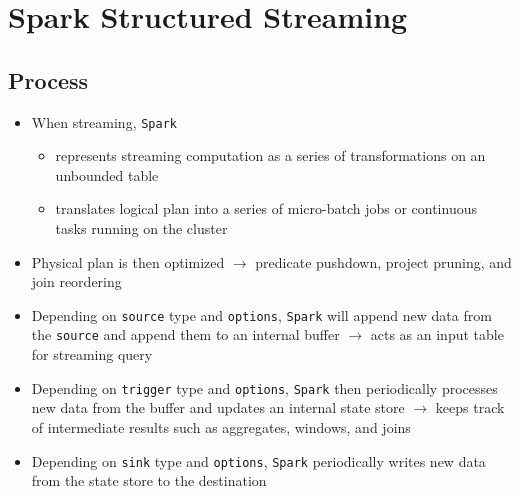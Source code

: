 \documentclass[11pt]{scrartcl}
\begin{document}
\section{Spark Structured Streaming} \label{structured_streaming}
\subsection{Process}
\begin{itemize}
	\item When streaming, \texttt{Spark} 
	\begin{itemize}
		\item represents streaming computation as a series of transformations on an unbounded table
		\item translates logical plan into a series of micro-batch jobs or continuous tasks running on the cluster
	\end{itemize}
	\item Physical plan is then optimized $\to$ predicate pushdown, project pruning, and join reordering
	\item Depending on \texttt{source} type and \texttt{options}, \texttt{Spark} will append new data from the \texttt{source} and append them to an internal buffer $\to$ acts as an input table for streaming query
	\item Depending on \texttt{trigger} type and \texttt{options}, \texttt{Spark} then periodically processes new data from the buffer and updates an internal state store $\to$ keeps track of intermediate results such as aggregates, windows, and joins
	\item Depending on \texttt{sink} type and \texttt{options}, \texttt{Spark} periodically writes new data from the state store to the destination
\end{itemize}
\end{document}
